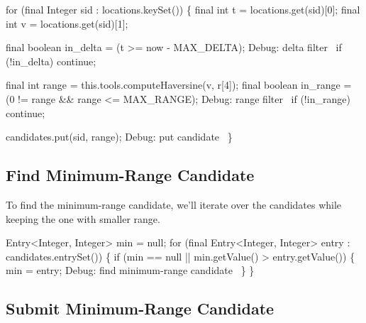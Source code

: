 \nwenddocs{}\endmoddef\nwstartdeflinemarkup{}\nwenddeflinemarkup
for (final Integer sid : locations.keySet()) \{
  final int t = locations.get(sid)[0];
  final int v = locations.get(sid)[1];

  final boolean in_delta = (t >= now - MAX_DELTA);
  \LA{}Debug: delta filter~{\nwtagstyle{}}\RA{}
  if (!in_delta)
    continue;

  final int range = this.tools.computeHaversine(v, r[4]);
  final boolean in_range = (0 != range && range <= MAX_RANGE);
  \LA{}Debug: range filter~{\nwtagstyle{}}\RA{}
  if (!in_range)
    continue;

  candidates.put(sid, range);
  \LA{}Debug: put candidate~{\nwtagstyle{}}\RA{}
\}
\nwendcode{}\nwdocspar

\subsection{Find Minimum-Range Candidate}

To find the minimum-range candidate, we'll iterate over the candidates while
keeping the one with smaller range.

\nwenddocs{}\endmoddef\nwstartdeflinemarkup{}\nwenddeflinemarkup
Entry<Integer, Integer> min = null;
for (final Entry<Integer, Integer> entry : candidates.entrySet()) \{
  if (min == null || min.getValue() > entry.getValue()) \{
    min = entry;
    \LA{}Debug: find minimum-range candidate~{\nwtagstyle{}}\RA{}
  \}
\}
\nwendcode{}\nwdocspar

\subsection{Submit Minimum-Range Candidate}

